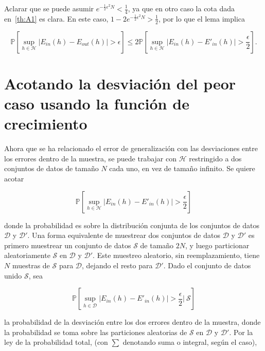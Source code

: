   Aclarar que se puede asumir $e^{- \frac{1}{2} \epsilon^2N} < \frac{1}{4}$,
  ya que en otro caso la cota dada en~\ref{th:A1} es clara.
  En este caso, $1 - 2e^{- \frac{1}{2} \epsilon^2N} > \frac{1}{2}$, por lo que
  el lema implica

  \begin{displaymath}
    \mathbb{P} \left[\sup_{h \in \mathcal{H}} | E_{in}(h) - E_{out}(h) | > \epsilon \right] \leq
    2 \mathbb{P} \left[\sup_{h \in \mathcal{H}} | E_{in}(h) - E'_{in}(h) | > \frac{\epsilon}{2} \right].
  \end{displaymath}




\section{Acotando la desviación del peor caso usando la función de crecimiento}


Ahora que se ha relacionado el error de generalización con las desviaciones entre
los errores dentro de la muestra, se puede trabajar con $\mathcal{H}$ restringido
a dos conjuntos de datos de tamaño $N$ cada uno, en vez de tamaño infinito.
Se quiere acotar

\begin{displaymath}
  \mathbb{P} \left[\sup_{h \in \mathcal{H}} | E_{in}(h) - E'_{in}(h) | > \frac{\epsilon}{2} \right]
\end{displaymath}

donde la probabilidad es sobre la distribución conjunta de los conjuntos de datos
$\mathcal{D}$ y $\mathcal{D}'$. Una forma equivalente de muestrear dos conjuntos
de datos $\mathcal{D}$ y $\mathcal{D}'$ es primero muestrear un conjunto de datos
$\mathcal{S}$ de tamaño $2N$, y luego particionar aleatoriamente $\mathcal{S}$
en $\mathcal{D}$ y $\mathcal{D}'$. Este muestreo aleatorio, sin
reemplazamiento, tiene $N$ muestras de $\mathcal{S}$ para $\mathcal{D}$, dejando
el resto para $\mathcal{D}'$. Dado el conjunto de datos unido $\mathcal{S}$, sea

\begin{displaymath}
    \mathbb{P} \left[\sup_{h \in \mathcal{D}} | E_{in}(h) - E'_{in}(h) | > \frac{\epsilon}{2} \Big\vert \
    \mathcal{S}  \right]
\end{displaymath}

la probabilidad de la desviación entre los dos errores dentro de la muestra,
donde la probabilidad se toma sobre las particiones aleatorias de $\mathcal{S}$
en $\mathcal{D}$ y $\mathcal{D}'$. Por la ley de la probabilidad total,
(con $\sum$ denotando suma o integral, según el caso),

